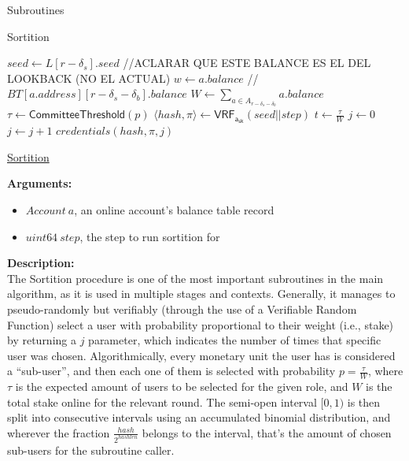 \documentclass[10pt,a4paper]{article}
\begin{document}
\begin{section}{Subroutines}
\begin{algorithm}[H]
    \caption{Sortition}
    \label{algo:sortition}
    \begin{algorithmic}[1]
        \State $seed \gets L[r - \delta_s].seed$
        //ACLARAR QUE ESTE BALANCE ES EL DEL LOOKBACK (NO EL ACTUAL)
        \State $w \gets a.balance$ //$BT[a.address][r-\delta_s-\delta_b].balance$
        \State $W \gets \sum_{a \in A_{r-\delta_s-\delta_b}}a.balance$
        \State $\tau \gets \mathsf{CommitteeThreshold}(p)$
        \State $ \langle hash, \pi \rangle \gets \mathsf{VRF_{a_{sk}}}(seed||step)$
        \State $t \gets \frac{\tau}{W}$
        \State $j \gets 0$
        \While{$\frac{hash}{2^{hashlen}}\notin [ \sum_{k=0}^j\mathsf{B}(k;w,t), \sum_{k=0}^{j+1}\mathsf{B}(k;w,t))$}
            \State $j \gets j+1$
        \EndWhile
        \Return $credentials(hash, \pi, j)$
    \EndFunction
    \end{algorithmic}
    \caption{\underline{Sortition}}
\end{algorithm}


\noindent \textbf{Arguments:}
\begin{itemize}
    \item $Account \ a$, an online account's balance table record
    \item $uint64 \ step$, the step to run sortition for
\end{itemize}

\noindent \textbf{Description:}\\
The Sortition procedure is one of the most important subroutines in the main algorithm, as it is 
used in multiple stages and contexts.
Generally, it manages to pseudo-randomly but verifiably (through the use of a Verifiable Random 
Function) select a user with probability proportional
to their weight (i.e., stake) by returning a $j$ parameter, which indicates the number of times that 
specific user was chosen.
Algorithmically, every monetary unit the user has is considered a ``sub-user'', and then each one 
of them is selected with probability $p = \frac{\tau}{W}$,
where $\tau$ is the expected amount of users to be selected for the given role, and $W$ is the total
stake online for the relevant round.
The semi-open interval $[0,1)$ is then split into consecutive intervals using an accumulated 
binomial distribution, and wherever the fraction $\frac{hash}{2^{hashlen}}$
belongs to the interval, that's the amount of chosen sub-users for the subroutine caller.\\


\end{section}
\end{document}
